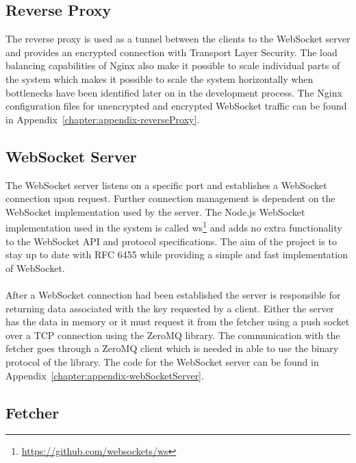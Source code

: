 \subsection{Reverse Proxy}

The reverse proxy is used as a tunnel between the clients to the WebSocket server and provides an encrypted connection with Transport Layer Security. The load balancing capabilities of Nginx also make it possible to scale individual parts of the system which makes it possible to scale the system horizontally when bottlenecks have been identified later on in the development process. The Nginx configuration files for unencrypted and encrypted WebSocket traffic can be found in Appendix~\ref{chapter:appendix-reverseProxy}.


\subsection{WebSocket Server}

The WebSocket server listens on a specific port and establishes a WebSocket connection upon request. Further connection management is dependent on the WebSocket implementation used by the server. The Node.js WebSocket implementation used in the system is called ws\footnote{\url{https://github.com/websockets/ws}} and adds no extra functionality to the WebSocket API and protocol specifications. The aim of the project is to stay up to date with RFC 6455 while providing a simple and fast implementation of WebSocket.
\\ \\
After a WebSocket connection had been established the server is responsible for returning data associated with the key requested by a client. Either the server has the data in memory or it must request it from the fetcher using a push socket over a TCP connection using the ZeroMQ library. The communication with the fetcher goes through a ZeroMQ client which is needed in able to use the binary protocol of the library. The code for the WebSocket server can be found in Appendix~\ref{chapter:appendix-webSocketServer}.

\subsection{Fetcher}

